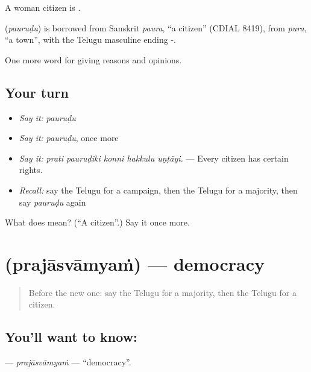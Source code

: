 A woman citizen is .

\begin{cousinweb}
\textbf{} (\emph{pauruḍu}) is borrowed from Sanskrit \emph{paura}, \textquotedblleft{}a citizen\textquotedblright{} (CDIAL 8419), from \emph{pura}, \textquotedblleft{}a town\textquotedblright{}, with the Telugu masculine ending -.
\end{cousinweb}

\begin{grammarlens}[title={What you've built}]
One more word for giving reasons and opinions.
\end{grammarlens}

\subsection*{Your turn}
\begin{itemize}
\raggedright
  \item \emph{Say it:} \emph{pauruḍu}
  \item \emph{Say it:} \emph{pauruḍu}, once more
  \item \emph{Say it:} \emph{prati pauruḍiki konni hakkulu uṇṭāyi.} — Every citizen has certain rights.
  \item \emph{Recall:} say the Telugu for a campaign, then the Telugu for a majority, then say \emph{pauruḍu} again
\end{itemize}

\begin{tcolorbox}[breakable,colback=teal!4,colframe=teal!35!black,title={Before you move on}]
What does  mean? (\textquotedblleft{}A citizen\textquotedblright{}.) Say it once more.
\end{tcolorbox}
\section[\texorpdfstring{\te{ప్రజాస్వామ్యం} (prajāsvāmyaṁ)}{ప్రజాస్వామ్యం (prajāsvāmyaṁ)}]{ (prajāsvāmyaṁ) — democracy}

\label{lesson:TE-C401-prajasvamyam}



\begin{quote}
Before the new one: say the Telugu for a majority, then the Telugu for a citizen.
\end{quote}

\subsection*{You'll want to know: }
\textbf{} — \emph{prajāsvāmyaṁ} — \textquotedblleft{}democracy\textquotedblright{}.

